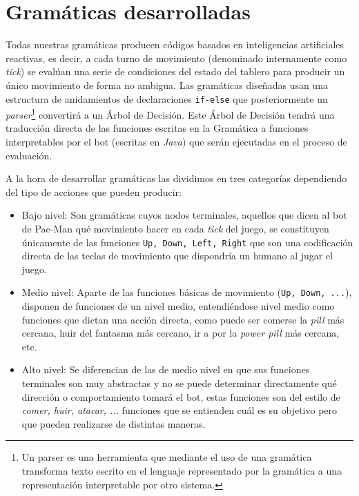 \section{Gramáticas desarrolladas}
Todas nuestras gramáticas producen códigos basados en inteligencias artificiales reactivas, es decir, a cada turno de movimiento (denominado internamente como \textit{tick}) se evalúan una serie de condiciones del estado del tablero para producir un único movimiento de forma no ambigua. Las gramáticas diseñadas usan una estructura de anidamientos de declaraciones \texttt{if-else} que posteriormente un \textit{parser}\footnote{Un parser es una herramienta que mediante el uso de una gramática transforma texto escrito en el lenguaje representado por la gramática a una representación interpretable por otro sistema\cite{parserTechopedia}.
} convertirá a un Árbol de Decisión. Este Árbol de Decisión tendrá una traducción directa de las funciones escritas en la Gramática a funciones interpretables por el bot (escritas en \textit{Java}) que serán ejecutadas en el proceso de evaluación.
 
A la hora de desarrollar gramáticas las dividimos en tres categorías dependiendo del tipo de acciones que pueden producir:
\begin{itemize}
\item Bajo nivel: Son gramáticas cuyos nodos terminales, aquellos que dicen al bot de Pac-Man qué movimiento hacer en cada \textit{tick} del juego, se constituyen únicamente de las funciones \texttt{Up, Down, Left, Right} que son una codificación directa de las teclas de movimiento que dispondría un humano al jugar el juego.

\item Medio nivel: Aparte de las funciones básicas de movimiento (\texttt{Up, Down, ...}), disponen de funciones de un nivel medio,  entendiéndose nivel medio como funciones que dictan una acción directa, como puede ser comerse la \textit{pill} más cercana, huir del fantasma más cercano, ir a por la \textit{power pill} más cercana, etc.

\item Alto nivel: Se diferencian de las de medio nivel en que sus funciones terminales son muy abstractas y no se puede determinar directamente qué dirección o comportamiento tomará el bot, estas funciones son del estilo de \textit{comer, huir, atacar, ...} funciones que se entienden cuál es su objetivo pero que pueden realizarse de distintas maneras.
\end{itemize}

